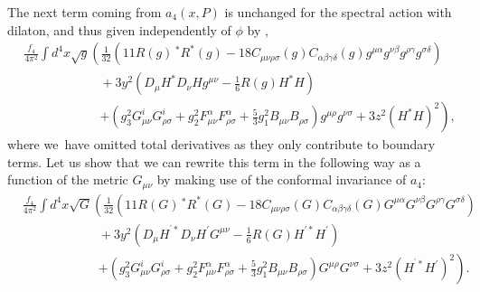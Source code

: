 \documentclass[12pt]{article}%
\begin{document}
The next term coming from $a_{4}\left(  x,P\right)  $ is unchanged for the
spectral action with dilaton, and thus given independently of $\phi$ by
\cite{ACAC},
\begin{align*}
&  \frac{f_{4}}{4\pi^{2}}\int d^{4}x\sqrt{g}\left(  \frac{1}{32}\left(
11R\left(  g\right)  \,^{\ast}R^{\ast}\left(  g\right)  -18C_{\mu\nu\rho
\sigma}\left(  g\right)  C_{\alpha\beta\gamma\delta}\left(  g\right)
g^{\mu\alpha}g^{\nu\beta}g^{\rho\gamma}g^{\sigma\delta}\right)  \right. \\
&  \hspace{1in}+3y^{2}\left(  D_{\mu}H^{\ast}D_{\nu}Hg^{\mu\nu}-\frac{1}%
{6}R\left(  g\right)  H^{\ast}H\right) \\
&  \qquad\qquad\qquad\left.  +\left(  g_{3}^{2}G_{\mu\nu}^{i}G_{\rho\sigma
}^{i}+g_{2}^{2}F_{\mu\nu}^{\alpha}F_{\rho\sigma}^{\alpha}+\frac{5}{3}g_{1}%
^{2}B_{\mu\nu}B_{\rho\sigma}\right)  g^{\mu\rho}g^{\nu\sigma}+3z^{2}\left(
H^{\ast}H\right)  ^{2}\right)  ,
\end{align*}
where we\ have omitted total derivatives as they only contribute to boundary
terms. Let us show that we can rewrite this term in the following way as a
function of the metric $G_{\mu\nu}$ by making use of the conformal invariance
of $a_{4}$:
\begin{align*}
&  \frac{f_{4}}{4\pi^{2}}\int d^{4}x\sqrt{G}\left(  \frac{1}{32}\left(
11R\left(  G\right)  \,^{\ast}R^{\ast}\left(  G\right)  -18C_{\mu\nu\rho
\sigma}\left(  G\right)  C_{\alpha\beta\gamma\delta}\left(  G\right)
G^{\mu\alpha}G^{\nu\beta}G^{\rho\gamma}G^{\sigma\delta}\right)  \right. \\
&  \hspace{1in}+3y^{2}\left(  D_{\mu}H^{^{\prime}\ast}D_{\nu}H^{\prime}%
G^{\mu\nu}-\frac{1}{6}R\left(  G\right)  H^{\prime\ast}H^{\prime}\right) \\
&  \qquad\qquad\qquad\left.  +\left(  g_{3}^{2}G_{\mu\nu}^{i}G_{\rho\sigma
}^{i}+g_{2}^{2}F_{\mu\nu}^{\alpha}F_{\rho\sigma}^{\alpha}+\frac{5}{3}g_{1}%
^{2}B_{\mu\nu}B_{\rho\sigma}\right)  G^{\mu\rho}G^{\nu\sigma}+3z^{2}\left(
H^{^{\prime}\ast}H^{\prime}\right)  ^{2}\right)  .
\end{align*}
\end{document}
